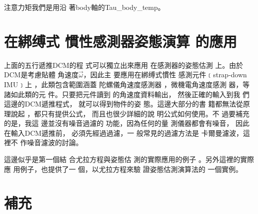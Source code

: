 \documentclass[12pt,twoside]{article}
\begin{document}
注意力矩我們是用沿%
著body軸的Tau\_body\_temp。

\part{\protect\bigskip \protect\bigskip 在綁缚式%
慣性感測器姿態演算%
的應用}

上面的五行遞推DCM的程%
式可以獨立出來應用%
在感測器的姿態估測%
上。由於DCM是考慮貼體%
角速度$\vec{\omega}$，因此主%
要應用在綁缚式慣性%
感測元件﹝strap-down IMU﹞上%
，此類包含範圍涵蓋%
陀螺儀角速度感測器%
，微機電角速度感測%
器，等諸如此類的元%
件。只要把元件讀到%
的角速度資料輸出，%
然後正確的輸入到我%
們這邊的DCM遞推程式，%
就可以得到物件的姿%
態。這邊大部分的書%
籍都無法從原理說起%
，都只有提供公式，%
而且也很少詳細的說%
明公式如何使用。不%
過要補充的是，我這%
邊並沒有噪音過濾的%
功能，因為任何的量%
測儀器都會有噪音，%
因此在輸入DCM遞推前，%
必須先經過過濾，一%
般常見的過濾方法是%
卡爾曼濾波，這裡不%
作噪音濾波的討論。

這邊似乎是第一個結%
合尤拉方程與姿態估%
測的實際應用的例子%
。另外這裡的實際應%
用例子，也提供了一%
個，以尤拉方程來驗%
證姿態估測演算法的%
一個實例。

\part{\protect\bigskip 補充}
\end{document}

